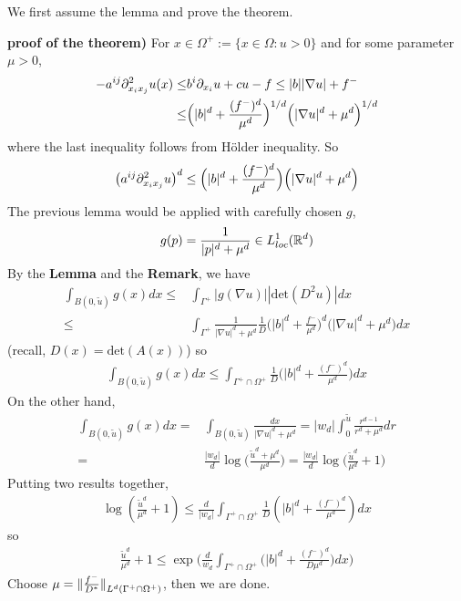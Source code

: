 \documentclass[12pt,a4paper]{article}
\newenvironment{proof}
{\begin{changemargin}{0.5cm}{0.5cm} 
	}%
	{\end{changemargin}
}
\newenvironment{p}
{\begin{proof} 
	}%
	{\end{proof}
}
\begin{document}
We first assume the lemma and prove the theorem.
\begin{p}
\textbf{proof of the theorem)} For $x\in \Omega^+ := \{x\in \Omega : u>0 \}$ and for some parameter $\mu>0$,
\begin{align*}
-a^{ij} \partial^2_{x_i x_j} u(x) \leq & b^i \partial_{x_i} u + cu -f \leq |b| |\nabla u| + f^- \\
\leq & \Big(|b|^d + \frac{(f^-)^d}{\mu^d} \Big)^{1/d} \Big(|\nabla u|^d + \mu^d \Big)^{1/d}
\end{align*}
where the last inequality follows from H\"older inequality. So
\begin{align*}
\big( a^{ij} \partial^2_{x_i x_j} u\big)^d \leq \Big(|b|^d + \frac{(f^-)^d}{\mu^d} \Big) \Big(|\nabla u|^d + \mu^d \Big)
\end{align*}
The previous lemma would be applied with carefully chosen $g$,
\begin{align*}
g(p) = \frac{1}{|p|^d + \mu^d} \in L^1_{loc}(\mathbb{R}^d)
\end{align*}
By the \textbf{Lemma} and the \textbf{Remark}, we have
\begin{align*}
\int_{B(0, \tilde{u})} g(x) dx \leq & \int_{\Gamma^+} |g(\nabla u)||\text{det}(D^2 u)| dx \\
\leq & \int_{\Gamma^+} \frac{1}{|\nabla u|^d + \mu^d} \frac{1}{D} \Big(|b|^d + \frac{f^-}{\mu^d} \Big)^d \Big(|\nabla u|^d + \mu^d \Big) dx
\end{align*}
(recall, $D(x) = \text{det}(A(x))$) so
\begin{align*}
\int_{B(0, \tilde{u})} g(x) dx \leq \int_{\Gamma^+ \cap \Omega^+} \frac{1}{D}  \Big(|b|^d + \frac{(f^-)^d}{\mu^d} \Big)dx
\end{align*}
On the other hand,
\begin{align*}
\int_{B(0, \tilde{u})} g(x) dx = & \int_{B(0, \tilde{u}) }\frac{dx}{|\nabla u|^d + \mu^d} = |w_d| \int_0^{\tilde{u}}\frac{r^{d-1}}{r^d + \mu^d} dr \\
= & \frac{|w_d|}{d} \log \Big(\frac{\tilde{u}^d + \mu^d}{\mu^d} \Big) =\frac{|w_d|}{d} \log \Big( \frac{\tilde{u}^d}{\mu^d} +1 \Big) 
\end{align*}
Putting two results together,
\begin{align*}
\log (\frac{\tilde{u}^d}{\mu^d}+1) \leq \frac{d}{|w_d|} \int_{\Gamma^+ \cap \Omega^+} \frac{1}{D} (|b|^d + \frac{(f^-)^d}{\mu^d}) dx
\end{align*}
so
\begin{align*}
\frac{\tilde{u}^d}{\mu^d}+1 \leq \exp \Big( \frac{d}{w_d} \int_{\Gamma^+ \cap \Omega^+} \big( |b|^d + \frac{(f^-)^d}{D \mu^d} \big)dx\Big)
\end{align*}
Choose $\mu = \snorms{\frac{f^-}{D^*}}{L^d(\Gamma^+ \cap \Omega^+)}$, then we are done.

\eop
\end{p}
\s
\end{document}
